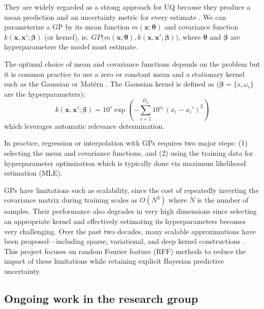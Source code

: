 \documentclass[11pt]{article}
\begin{document}
They are widely regarded as a strong approach for UQ because they produce a mean prediction and an uncertainty metric for every estimate \cite{UncertaintyReview}. We can parameterize a GP by its mean function $\textit{m}(\boldsymbol{x}; \boldsymbol{\theta})$ and covariance function $\textit{k}(\boldsymbol{x}, \boldsymbol{x'}; \boldsymbol{\beta})$ (or kernel), ie. $GP\big(\textit{m}(\boldsymbol{x}; \boldsymbol{\theta}), \textit{k}(\boldsymbol{x}, \boldsymbol{x'}; \boldsymbol{\beta})\big)$, where $\boldsymbol{\theta}$ and $\boldsymbol{\beta}$ are hyperparameters the model must estimate.

The optimal choice of mean and covariance functions depends on the problem but it is common practice to use a zero or constant mean and a stationary kernel such as the Gaussian or Mat\'ern \cite{RN2089}. The Gaussian kernel is defined as ($\boldsymbol{\beta} = \{s, \omega_i\}$ are the hyperparameters):
\begin{equation}
    k(\mathbf{x}, \mathbf{x}'; \boldsymbol{\beta}) = 10^s \exp\left(-\sum_{i=1}^{D_x} 10^{\omega_i}\left( x_i - x_i'\right)^2\right)
    \label{eq gaussian kernel}
\end{equation}
which leverages automatic relevance determination. 

In practice, regression or interpolation with GPs requires two major steps: (1) selecting the mean and covariance functions, and (2) using the training data for hyperparameter optimization which is typically done via maximum likelihood estimation (MLE).

GPs have limitations such as scalability, since the cost of repeatedly inverting the covariance matrix during training scales as $O(N^3)$ where $N$ is the number of samples. Their performance also degrades in very high dimensions since selecting an appropriate kernel and effectively estimating its hyperparameters becomes very challenging.
Over the past two decades, many scalable approximations have been proposed---including sparse,
variational, and deep kernel constructions
\citep{snelson2005sparse,hensman2013svgp,deisenroth2015dgp,gal2016dropout,wilson2016deep}.
This project focuses on random Fourier feature (RFF) methods
\citep{rahimi2007rff,yu2016orf} to reduce the impact of these limitations while retaining
explicit Bayesian predictive uncertainty.

\subsection{Ongoing work in the research group}
\label{sec:group-work}
\end{document}
